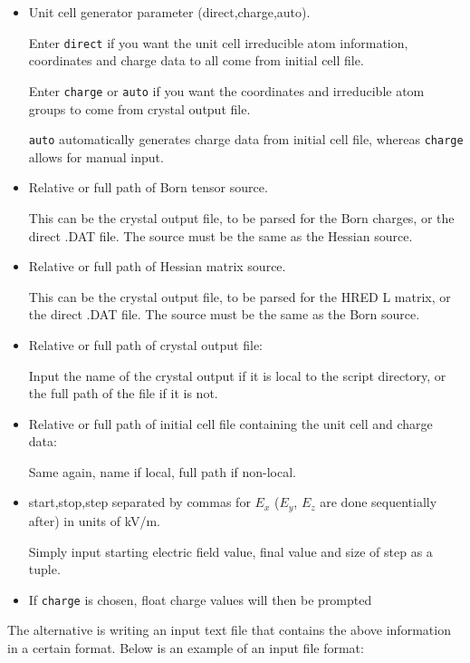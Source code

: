 \begin{itemize}
	\item Unit cell generator parameter (direct,charge,auto).
	
	Enter \texttt{direct} if you want the unit cell irreducible atom information, coordinates and charge data to all come from initial cell file.
	
	Enter \texttt{charge} or \texttt{auto} if you want the coordinates and irreducible atom groups to come from crystal output file.
	
	\texttt{auto} automatically generates charge data from initial cell file, whereas \texttt{charge} allows for manual input.
	
	\item Relative or full path of Born tensor source.
	
	This can be the crystal output file, to be parsed for the Born charges, or the direct .DAT file. The source must be the same as the Hessian source.
	
	\item Relative or full path of Hessian matrix source.
	
	This can be the crystal output file, to be parsed for the HRED L matrix, or the direct .DAT file. The source must be the same as the Born source.
	
	\item Relative or full path of crystal output file:
	
	Input the name of the crystal output if it is local to the script directory, or the full path of the file if it is not.
	
	\item Relative or full path of initial cell file containing the unit cell and charge data:
	
	Same again, name if local, full path if non-local.
	
	\item start,stop,step separated by commas for $E_x$ ($E_y$, $E_z$ are done sequentially after) in units of kV/m.
	
	Simply input starting electric field value, final value and size of step as a tuple.
	
	\item If \texttt{charge} is chosen, float charge values will then be prompted
\end{itemize}

The alternative is writing an input text file that contains the above information in a certain format. Below is an example of an input file format:

